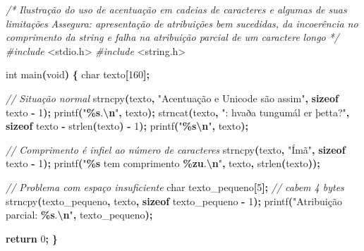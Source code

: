 \documentclass[
  11pt,
  a4paper,
]{scrbook}
\newenvironment{Shaded}{\begin{snugshade}}{\end{snugshade}}
\newcommand{\CommentTok}[1]{\textcolor[rgb]{0.56,0.35,0.01}{\textit{#1}}}
\newcommand{\ControlFlowTok}[1]{\textcolor[rgb]{0.13,0.29,0.53}{\textbf{#1}}}
\newcommand{\DataTypeTok}[1]{\textcolor[rgb]{0.13,0.29,0.53}{#1}}
\newcommand{\DecValTok}[1]{\textcolor[rgb]{0.00,0.00,0.81}{#1}}
\newcommand{\ImportTok}[1]{#1}
\newcommand{\KeywordTok}[1]{\textcolor[rgb]{0.13,0.29,0.53}{\textbf{#1}}}
\newcommand{\NormalTok}[1]{#1}
\newcommand{\OperatorTok}[1]{\textcolor[rgb]{0.81,0.36,0.00}{\textbf{#1}}}
\newcommand{\PreprocessorTok}[1]{\textcolor[rgb]{0.56,0.35,0.01}{\textit{#1}}}
\newcommand{\SpecialCharTok}[1]{\textcolor[rgb]{0.81,0.36,0.00}{\textbf{#1}}}
\newcommand{\StringTok}[1]{\textcolor[rgb]{0.31,0.60,0.02}{#1}}
\begin{document}
\begin{Shaded}
\begin{Highlighting}[]
\CommentTok{/*}
\CommentTok{Ilustração do uso de acentuação em cadeias de caracteres e algumas de suas}
\CommentTok{    limitações}
\CommentTok{Assegura: apresentação de atribuições bem sucedidas, da incoerência no}
\CommentTok{    comprimento da string e falha na atribuição parcial de um caractere}
\CommentTok{    longo}
\CommentTok{*/}
\PreprocessorTok{\#include }\ImportTok{\textless{}stdio.h\textgreater{}}
\PreprocessorTok{\#include }\ImportTok{\textless{}string.h\textgreater{}}


\DataTypeTok{int}\NormalTok{ main}\OperatorTok{(}\DataTypeTok{void}\OperatorTok{)} \OperatorTok{\{}
    \DataTypeTok{char}\NormalTok{ texto}\OperatorTok{[}\DecValTok{160}\OperatorTok{];}

    \CommentTok{// Situação normal}
\NormalTok{    strncpy}\OperatorTok{(}\NormalTok{texto}\OperatorTok{,} \StringTok{"Acentuação e Unicode são assim"}\OperatorTok{,} \KeywordTok{sizeof}\NormalTok{ texto }\OperatorTok{{-}} \DecValTok{1}\OperatorTok{);}
\NormalTok{    printf}\OperatorTok{(}\StringTok{"}\SpecialCharTok{\%s}\StringTok{.}\SpecialCharTok{\textbackslash{}n}\StringTok{"}\OperatorTok{,}\NormalTok{ texto}\OperatorTok{);}
\NormalTok{    strncat}\OperatorTok{(}\NormalTok{texto}\OperatorTok{,} \StringTok{": hvaða tungumál er þetta?"}\OperatorTok{,} \KeywordTok{sizeof}\NormalTok{ texto }\OperatorTok{{-}}\NormalTok{ strlen}\OperatorTok{(}\NormalTok{texto}\OperatorTok{)} \OperatorTok{{-}} \DecValTok{1}\OperatorTok{);}
\NormalTok{    printf}\OperatorTok{(}\StringTok{"}\SpecialCharTok{\%s\textbackslash{}n}\StringTok{"}\OperatorTok{,}\NormalTok{ texto}\OperatorTok{);}

    \CommentTok{// Comprimento é infiel ao número de caracteres}
\NormalTok{    strncpy}\OperatorTok{(}\NormalTok{texto}\OperatorTok{,} \StringTok{"Ímã"}\OperatorTok{,} \KeywordTok{sizeof}\NormalTok{ texto }\OperatorTok{{-}} \DecValTok{1}\OperatorTok{);}
\NormalTok{    printf}\OperatorTok{(}\StringTok{"\textquotesingle{}}\SpecialCharTok{\%s}\StringTok{\textquotesingle{} tem comprimento }\SpecialCharTok{\%zu}\StringTok{.}\SpecialCharTok{\textbackslash{}n}\StringTok{"}\OperatorTok{,}\NormalTok{ texto}\OperatorTok{,}\NormalTok{ strlen}\OperatorTok{(}\NormalTok{texto}\OperatorTok{));}

    \CommentTok{// Problema com espaço insuficiente}
    \DataTypeTok{char}\NormalTok{ texto\_pequeno}\OperatorTok{[}\DecValTok{5}\OperatorTok{];}  \CommentTok{// cabem 4 bytes}
\NormalTok{    strncpy}\OperatorTok{(}\NormalTok{texto\_pequeno}\OperatorTok{,}\NormalTok{ texto}\OperatorTok{,} \KeywordTok{sizeof}\NormalTok{ texto\_pequeno }\OperatorTok{{-}} \DecValTok{1}\OperatorTok{);}
\NormalTok{    printf}\OperatorTok{(}\StringTok{"Atribuição parcial: \textquotesingle{}}\SpecialCharTok{\%s}\StringTok{\textquotesingle{}.}\SpecialCharTok{\textbackslash{}n}\StringTok{"}\OperatorTok{,}\NormalTok{ texto\_pequeno}\OperatorTok{);}

    \ControlFlowTok{return} \DecValTok{0}\OperatorTok{;}
\OperatorTok{\}}
\end{Highlighting}
\end{Shaded}
\end{document}
